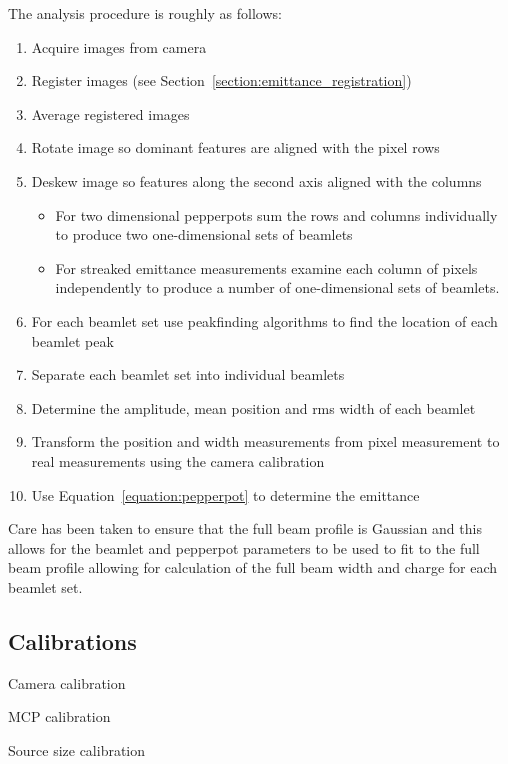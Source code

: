 The analysis procedure is roughly as follows:
\begin{enumerate}
    \item Acquire images from camera
    \item Register images (see Section~\ref{section:emittance_registration})
    \item Average registered images
    \item Rotate image so dominant features are aligned with the pixel rows
    \item Deskew image so features along the second axis aligned with the columns
    \begin{itemize}
        \item For two dimensional pepperpots sum the rows and columns individually to produce two one-dimensional sets of beamlets
        \item For streaked emittance measurements examine each column of pixels independently to produce a number of one-dimensional sets of beamlets.
    \end{itemize}
    \item For each beamlet set use peakfinding algorithms to find the location of each beamlet peak
    \item Separate each beamlet set into individual beamlets
    \item Determine the amplitude, mean position and \gls{rms} width of each beamlet
    \item Transform the position and width measurements from pixel measurement to real measurements using the camera calibration
    \item Use Equation~\ref{equation:pepperpot} to determine the emittance
\end{enumerate}

Care has been taken to ensure that the full beam profile is Gaussian and this allows for the beamlet and pepperpot parameters to be used to fit to the full beam profile allowing for calculation of the full beam width and charge for each beamlet set.

\subsection{Calibrations}

Camera calibration

MCP calibration

Source size calibration

